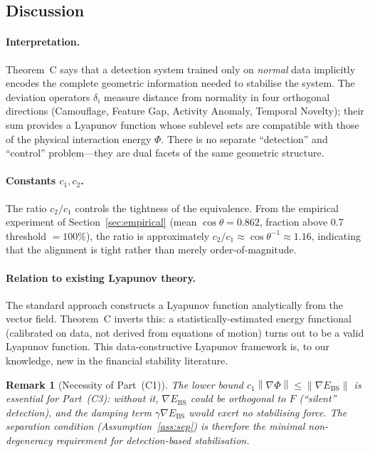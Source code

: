 \documentclass[11pt]{article}
\newtheorem{remark}[theorem]{Remark}
\theoremstyle{definition}
\newcommand{\grad}{\nabla}
\newcommand{\Ebs}{E_{\mathrm{BS}}}
\newcommand{\norm}[1]{\left\|#1\right\|}
\newcommand{\costheta}{\cos\theta}
\begin{document}
\subsection{Discussion}
\label{sec:equiv:disc}

\paragraph{Interpretation.}
Theorem~C says that a detection system trained only on \emph{normal} data implicitly
encodes the complete geometric information needed to stabilise the system.  The
deviation operators $\delta_i$ measure distance from normality in four orthogonal
directions (Camouflage, Feature Gap, Activity Anomaly, Temporal Novelty); their
sum provides a Lyapunov function whose sublevel sets are compatible with those
of the physical interaction energy $\Phi$.  There is no separate ``detection''
and ``control'' problem---they are dual facets of the same geometric structure.

\paragraph{Constants $c_1, c_2$.}
The ratio $c_2/c_1$ controls the tightness of the equivalence.  From the empirical
experiment of Section~\ref{sec:empirical} (mean $\costheta = 0.862$,
fraction above $0.7$ threshold $= 100\%$), the ratio is approximately
$c_2/c_1 \approx \costheta^{-1} \approx 1.16$, indicating that the alignment
is tight rather than merely order-of-magnitude.

\paragraph{Relation to existing Lyapunov theory.}
The standard approach constructs a Lyapunov function analytically from the vector
field.  Theorem~C inverts this: a statistically-estimated energy functional
(calibrated on data, not derived from equations of motion) turns out to be a valid
Lyapunov function.  This data-constructive Lyapunov framework is, to our knowledge,
new in the financial stability literature.

\begin{remark}[Necessity of Part~(C1)]
\label{rem:C1_necessity}
The lower bound $c_1\norm{\grad\Phi} \le \norm{\grad\Ebs}$ is essential for
Part~(C3): without it, $\grad\Ebs$ could be orthogonal to $F$ (``silent''
detection), and the damping term $\gamma\grad\Ebs$ would exert no stabilising
force.  The separation condition (Assumption~\ref{ass:sep}) is therefore the
minimal non-degeneracy requirement for detection-based stabilisation.
\end{remark}
\end{document}

